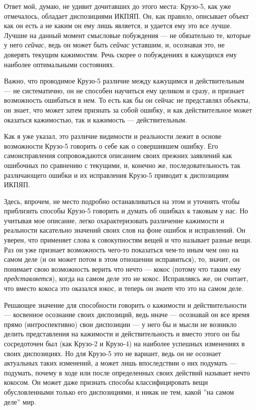 \documentclass[11pt]{book}
\begin{document}
Ответ мой, думаю, не удивит дочитавших до этого места: Крузо-5, как уже отмечалось, обладает диспозициями ИКПЯП. Он, как правило, описывает объект как он есть а не каким он ему лишь является, и удается ему это все лучше. Лучшие на данный момент смысловые побуждения --- не обязательно те, которые у него \textit{сейчас}, ведь он может быть \textit{сейчас} уставшим, и, осознавая это, не доверять текущим кажимостям. Речь скорее о побуждениях в кажущихся ему наиболее оптимальными состояниях.

Важно, что проводимое Крузо-5 различие между кажущимся и действительным --- не систематично, он не способен научиться ему целиком и сразу, и признает возможность ошибаться в нем. То есть как бы он сейчас не представлял объекты, он знает, что может затем признать за собой ошибку, и как действительное может оказаться кажимостью, так и кажимость --- действительным.

Как я уже указал, это различие видимости и реальности лежит в основе возможности Крузо-5 говорить о себе как о совершившем ошибку. Его самоисправления сопровождаются описанием своих прежних заявлений как ошибочных по сравнению с текущими, и, конечно же, последовательность так различающего ошибки и их исправления Крузо-5 приводит к диспозициям ИКПЯП.

Здесь, впрочем, не место подробно останавливаться на этом и уточнять чтобы приблизить способы Крузо-5 говорить и думать об ошибках к таковым у нас. Но учитывая мое описание, легко охарактеризовать различение кажимости и реальности касательно значений своих слов на фоне ошибок и исправлений. Он уверен, что применяет слова к совокупностям вещей и что называет разные вещи. Раз он уже признает возможность чего-то показаться чем-то иным чем оно на самом деле (и он может потом в этом отношении исправиться), то, значит, он понимает свою возможность верить что нечто --- кокос (потому что таким ему \textit{представляется}), когда на самом деле это не кокос. Исправляясь же, он считает, что вместо кокоса это оказался юкос, и теперь он \textit{знает} что это на самом деле.

Решающее значение для способности говорить о кажимости и действительности --- косвенное осознание своих диспозиций, ведь иначе --- осознавай он все время прямо (интроспективно) свои диспозиции --- у него бы и мысли не возникло делить представления на кажимости и действительность и вместо этого он бы сосредоточен был (как Крузо-2 и Крузо-4) на наиболее успешных изменениях в своих диспозициях. Но для Крузо-5 это не вариант, ведь он не осознает актуальных таких изменений, а может лишь впоследствии о них подумать --- подумать, почему в ходе или после определенных своих действий называет нечто кокосом. Он может даже признать способы классифицировать вещи обусловленными только его диспозициями, и никак не тем, какой ''на самом деле'' мир.
\end{document}
